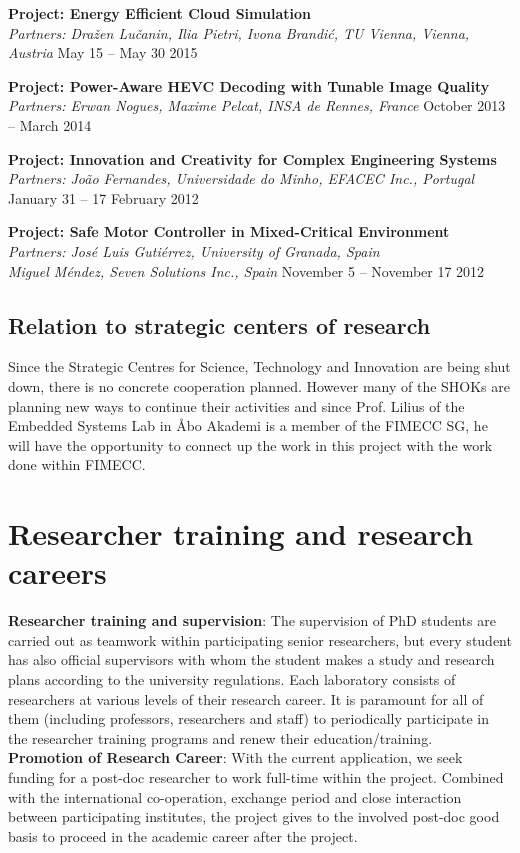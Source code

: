 \documentclass{article}
\begin{document}
\textbf{Project: Energy Efficient Cloud Simulation}\\
\textsl{Partners: Dra\v{z}en Lu\v{c}anin, Ilia Pietri, Ivona Brandi\'{c}, TU Vienna, Vienna, Austria}
\hfill May 15 -- May 30 2015

\textbf{Project: Power-Aware HEVC Decoding with Tunable Image Quality}\\
\textsl{Partners: Erwan Nogues, Maxime Pelcat, INSA de Rennes, France}
\hfill October 2013 -- March 2014

\textbf{Project: Innovation and Creativity for Complex Engineering Systems}\\
\textsl{Partners: Jo\~{a}o Fernandes, Universidade do Minho, EFACEC Inc., Portugal}
\hfill January 31 -- 17 February 2012

\textbf{Project: Safe Motor Controller in Mixed-Critical Environment}\\
\textsl{Partners: Jos\'{e} Luis Guti\'{e}rrez, University of Granada, Spain \\ Miguel M\'{e}ndez, Seven Solutions Inc., Spain} 
\hfill November 5 -- November 17 2012

\subsection{Relation to strategic centers of research}
Since the Strategic Centres for Science, Technology and Innovation are being shut down, there is no concrete cooperation planned. 
However many of the SHOKs are planning new ways to continue their activities and since Prof. Lilius of the Embedded Systems Lab in \AA{}bo Akademi is a member of the FIMECC SG, 
he will have the opportunity to connect up the work in this project with the work done within FIMECC.


\section{Researcher training and research careers}
\textbf{Researcher training and supervision}: The supervision of PhD students are carried out as teamwork within participating senior researchers, 
but every student has also official supervisors with whom the student makes a study and research plans according to the university regulations. 
Each laboratory consists of researchers at various levels of their research career. 
It is paramount for all of them (including professors, researchers and staff) to periodically participate in the researcher training programs and renew their education/training.\\ 
\textbf{Promotion of Research Career}: With the current application, we seek funding for a post-doc researcher to work full-time within the project. 
Combined with the international co-operation, exchange period and close interaction between participating institutes, the project gives to the involved post-doc good basis to proceed in the academic career after the project.
\end{document}
